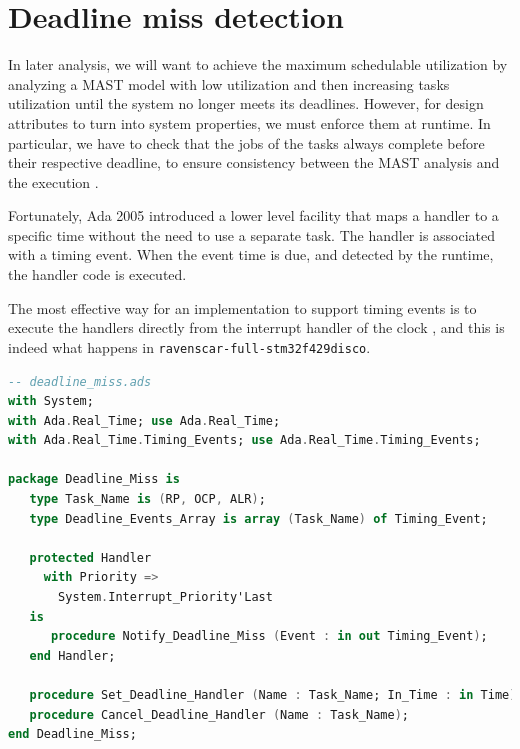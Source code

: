 \documentclass{article}
\begin{document}
\section{Deadline miss detection}

In later analysis, we will want to achieve the maximum schedulable utilization by analyzing a MAST model with low utilization and then increasing tasks utilization until the system no longer meets its deadlines. However, for design attributes to turn into system properties, we must enforce them at runtime. In particular, we have to check that the jobs of the tasks always complete before their respective deadline, to ensure consistency between the MAST analysis and the execution \cite{timing-properties}.

Fortunately, Ada 2005 introduced a lower level facility that maps a handler to a specific time without the need to use a separate task. The handler is associated with a timing event. When the event time is due, and detected by the runtime, the handler code is executed.

The most effective way for an implementation to support timing events is to execute the handlers directly from the interrupt handler of the clock \cite{timing-events}, and this is indeed what happens in \texttt{ravenscar-full-stm32f429disco}.

\begin{lstlisting}[language=Ada]
-- deadline_miss.ads
with System;
with Ada.Real_Time; use Ada.Real_Time;
with Ada.Real_Time.Timing_Events; use Ada.Real_Time.Timing_Events;

package Deadline_Miss is
   type Task_Name is (RP, OCP, ALR);
   type Deadline_Events_Array is array (Task_Name) of Timing_Event;

   protected Handler
     with Priority =>
       System.Interrupt_Priority'Last
   is
      procedure Notify_Deadline_Miss (Event : in out Timing_Event);
   end Handler;

   procedure Set_Deadline_Handler (Name : Task_Name; In_Time : in Time);
   procedure Cancel_Deadline_Handler (Name : Task_Name);
end Deadline_Miss;
\end{lstlisting}
\end{document}
